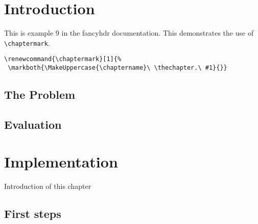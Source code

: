 \documentclass{book}
\renewcommand{\chaptermark}[1]{%
 \markboth{\MakeUppercase{\chaptername}\ \thechapter.\ #1}{}}
\begin{document}
\chapter{Introduction}

\begin{boxedminipage}{\textwidth}
This is example 9 in the fancyhdr documentation. 
This demonstrates the use of \verb|\chaptermark|.
\begin{verbatim}
\renewcommand{\chaptermark}[1]{%
 \markboth{\MakeUppercase{\chaptername}\ \thechapter.\ #1}{}}
\end{verbatim}
\end{boxedminipage}

\section{The Problem}
\label{sec:problem}

\lipsum[1]

\section{Evaluation}

\lipsum[2]

\chapter{Implementation}

Introduction of this chapter

\lipsum[3]

\section{First steps}
\label{sec:first-steps}

\lipsum
\end{document}

